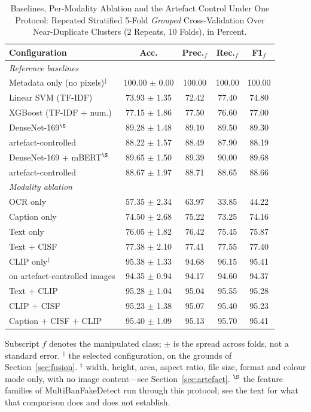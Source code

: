 \documentclass[pdflatex,sn-mathphys-num]{sn-jnl}
\begin{document}
\begin{table}[!tb]
\caption{Baselines, Per-Modality Ablation and the Artefact Control Under One
Protocol: Repeated Stratified 5-Fold \emph{Grouped} Cross-Validation Over
Near-Duplicate Clusters ($2$ Repeats, $10$ Folds), in Percent.}
\label{tab:ablation}
\centering
\setlength{\tabcolsep}{3.5pt}
\footnotesize
\begin{tabular}{lcccc}
\toprule
\textbf{Configuration} & \textbf{Acc.} & \textbf{Prec.$_{f}$} &
\textbf{Rec.$_{f}$} & \textbf{F1$_{f}$} \\
\midrule
\multicolumn{5}{l}{\emph{Reference baselines}} \\
Metadata only (no pixels)$^{\ddagger}$ & 100.00 $\pm$ 0.00 & 100.00 & 100.00 & 100.00 \\
Linear SVM (TF-IDF)     & 73.93 $\pm$ 1.35 & 72.42 & 77.40 & 74.80 \\
XGBoost (TF-IDF + num.) & 77.15 $\pm$ 1.86 & 77.50 & 76.60 & 77.00 \\
DenseNet-169$^{\S}$     & 89.28 $\pm$ 1.48 & 89.10 & 89.50 & 89.30 \\
\quad artefact-controlled & 88.22 $\pm$ 1.57 & 88.49 & 87.90 & 88.19 \\
DenseNet-169 + mBERT$^{\S}$ & 89.65 $\pm$ 1.50 & 89.39 & 90.00 & 89.68 \\
\quad artefact-controlled & 88.67 $\pm$ 1.97 & 88.71 & 88.65 & 88.66 \\
\midrule
\multicolumn{5}{l}{\emph{Modality ablation}} \\
OCR only              & 57.35 $\pm$ 2.34 & 63.97 & 33.85 & 44.22 \\
Caption only          & 74.50 $\pm$ 2.68 & 75.22 & 73.25 & 74.16 \\
Text only             & 76.05 $\pm$ 1.82 & 76.42 & 75.45 & 75.87 \\
Text + CISF           & 77.38 $\pm$ 2.10 & 77.41 & 77.55 & 77.40 \\
\midrule
CLIP only$^{\dagger}$ & 95.38 $\pm$ 1.33 & 94.68 & 96.15 & 95.41 \\
\quad on artefact-controlled images & 94.35 $\pm$ 0.94 & 94.17 & 94.60 & 94.37 \\
Text + CLIP           & 95.28 $\pm$ 1.04 & 95.04 & 95.55 & 95.28 \\
CLIP + CISF           & 95.23 $\pm$ 1.38 & 95.07 & 95.40 & 95.23 \\
Caption + CISF + CLIP & 95.40 $\pm$ 1.09 & 95.13 & 95.70 & 95.41 \\
\bottomrule
\end{tabular}
\par\smallskip\parbox{\linewidth}{\footnotesize \footnotesize Subscript $f$ denotes the
manipulated class; $\pm$ is the spread across folds, not a standard error.
$^{\dagger}$ the selected configuration, on the grounds of
Section~\ref{sec:fusion}. $^{\ddagger}$ width, height, area, aspect ratio, file
size, format and colour mode only, with no image content---see
Section~\ref{sec:artefact}. $^{\S}$ the feature families of
MultiBanFakeDetect \cite{multibanfake} run through this protocol; see the text
for what that comparison does and does not establish.}
\end{table}
\end{document}
